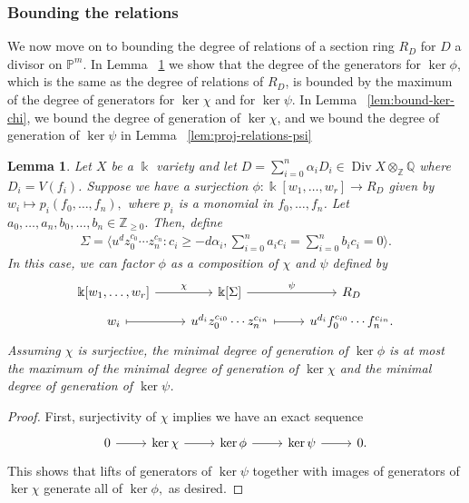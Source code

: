 \documentclass{amsart}
\theoremstyle{plain}
\newtheorem{lem}[thm]{Lemma}
\theoremstyle{definition}
\theoremstyle{remark}
\numberwithin{equation}{section}
\newcommand\sssec{\subsubsection}
\newcommand\bq{{\mathbb Q}}
\newcommand\bp{{\mathbb P}}
\newcommand\bz{{\mathbb Z}}
\newcommand\bk{{\Bbbk}}
\DeclareMathOperator\di{Div}
\newcommand\bida{a}
\newcommand\bidb{b}
\begin{document}
\sssec*{Bounding the relations}
\label{sssec:relations-projective}

We now move on to bounding the degree of relations of a section ring $R_D$ for $D$ a divisor on $\bp^m$.
In Lemma ~\ref{lem:composite-map} we show that the degree of the
generators for $\ker \phi$, which is the same as the degree of relations
of $R_D$, is bounded by the maximum of the degree of generators for
$\ker \chi$ and for $\ker \psi$.
In Lemma ~\ref{lem:bound-ker-chi}, we bound the degree of generation of
$\ker \chi $, and we bound the degree of generation of $\ker \psi$ in Lemma ~\ref{lem:proj-relations-psi}

\begin{lem}
\label{lem:composite-map}
Let $X$ be a $\bk$ variety and let $D = \sum_{i=0}^{n}\alpha_i D_i\in \di X \otimes_\bz \bq$ where $D_i = V(f_i)$. Suppose we have a
surjection $\phi\colon \bk[w_1,\ldots, w_r] \rightarrow R_D$ given by $w_i
\mapsto p_i(f_0, \ldots, f_n),$ where $p_i$ is a monomial in $f_0,\ldots, f_n$.
Let $\bida_0, \ldots, \bida_n, \bidb_0, \ldots, \bidb_n \in \bz_{\geq 0}.$
Then, define
\begin{align*}
	\Sigma = \langle u^d z_0^{c_0} \cdots z_n^{c_n} : c_i \geq -d \alpha_i, \sum_{i=0}^{n} \bida_i c_i = \sum_{i=0}^{n} \bidb_i c_i = 0 \rangle. 
\end{align*}
In this case, we can factor $\phi$ as a composition of $\chi$ and $\psi$ defined by
\[
\begin{tikzcd}[row sep = tiny]
\bk[w_1,\ldots, w_r] \ar {r}{\chi} & \bk[\Sigma] \ar {r}{\psi} & R_D \\
w_i \arrow[mapsto]{r} & u^{d_i}z_0^{c_{i0}} \cdots z_n^{c_{in}} \arrow[mapsto]{r} & u^{d_i}f_0^{c_{i0}} \cdots f_n^{c_{in}}.
\end{tikzcd}
\]
Assuming $\chi$ is surjective, the minimal degree of generation of $\ker \phi$
is at most the maximum of the minimal degree of generation of $\ker \chi$ and
the minimal degree of generation of $\ker \psi$.
\end{lem}

\begin{proof}
First, surjectivity of $\chi$ implies we have an exact sequence
\[
\begin{tikzcd}
0 \ar {r} & \ker \chi \ar{r} & \ker \phi \ar {r} & \ker \psi \ar r & 0.
\end{tikzcd}
\]
This shows that lifts of generators of $\ker \psi$ together with images of
generators of $\ker \chi$ generate all of $\ker \phi,$ as desired. 
\end{proof}
\end{document}
